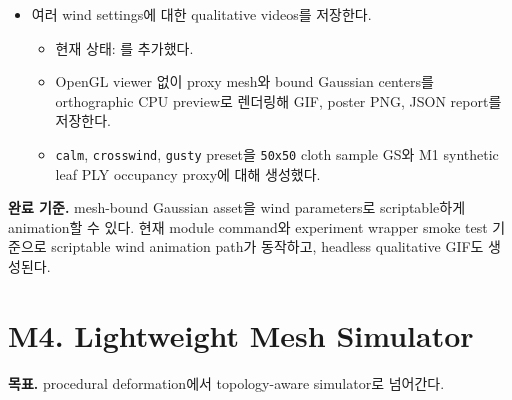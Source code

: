 \documentclass[10pt]{article}
\newcommand{\done}{\textcolor{DoneGreen}{\(\boxtimes\)}}
\newcommand{\code}[1]{\texttt{#1}}
\begin{document}
\begin{itemize}
\begin{itemize}
      \item 현재 상태: \code{--transport-mode full}은 Gaussian center와 anisotropic frame/covariance를 함께 transport한다.
      \item 현재 상태: \code{--transport-mode position\_only}는 center만 mesh에 bind하고 anisotropic frame은 canonical frame으로 유지해 비교 baseline으로 쓴다.
      \item local-frame / SH residual appearance correction은 M9의 core runtime module로 남긴다. M3에서는 geometry transport path만 검증한다.
    \end{itemize}
  \item[\done] 여러 wind settings에 대한 qualitative videos를 저장한다.
    \begin{itemize}
      \item 현재 상태: 를 추가했다.
      \item OpenGL viewer 없이 proxy mesh와 bound Gaussian centers를 orthographic CPU preview로 렌더링해 GIF, poster PNG, JSON report를 저장한다.
      \item \code{calm}, \code{crosswind}, \code{gusty} preset을 \code{50x50} cloth sample GS와 M1 synthetic leaf PLY occupancy proxy에 대해 생성했다.
    \end{itemize}
\end{itemize}

\textbf{완료 기준.} mesh-bound Gaussian asset을 wind parameters로 scriptable하게 animation할 수 있다. 현재 module command와 experiment wrapper smoke test 기준으로 scriptable wind animation path가 동작하고, headless qualitative GIF도 생성된다.

\section{M4. Lightweight Mesh Simulator}

\textbf{목표.} procedural deformation에서 topology-aware simulator로 넘어간다.
\end{document}

